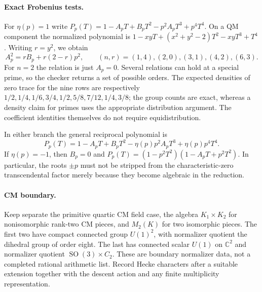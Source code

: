 \documentclass[11pt]{article}
\DeclareMathOperator{\SO}{SO}
\begin{document}
\paragraph{Exact Frobenius tests.}
For $\eta(p)=1$ write
$P_p(T)=1-A_pT+B_pT^2-p^2A_pT^3+p^4T^4$.
On a QM component the normalized polynomial is
$1-xyT+(x^2+y^2-2)T^2-xyT^3+T^4$.
Writing $r=y^2$, we obtain
\[
 A_p^2=rB_p+r(2-r)p^2,\qquad
 (n,r)=(1,4),(2,0),(3,1),(4,2),(6,3).
\]
For $n=2$ the relation is just $A_p=0$. Several relations can hold at a special
prime, so the checker returns a set of possible orders. The expected densities
of zero trace for the nine rows are respectively
$1/2,1/4,1/6,3/4,1/2,5/8,7/12,1/4,3/8$; the group counts are exact,
whereas a density claim for primes uses the appropriate distribution argument.
The coefficient identities themselves do not require equidistribution.

In either branch the general reciprocal polynomial is
\[
 P_p(T)=1-A_pT+B_pT^2-\eta(p)p^2A_pT^3+\eta(p)p^4T^4.
\]
If $\eta(p)=-1$, then $B_p=0$ and
$P_p(T)=(1-p^2T^2)(1-A_pT+p^2T^2)$.
In particular, the roots $\pm p$ must not be stripped from the characteristic-zero
transcendental factor merely because they become algebraic in the reduction.

\paragraph{CM boundary.}
Keep separate the primitive quartic CM field case, the algebra $K_1\times K_2$
for nonisomorphic rank-two CM pieces, and $M_2(K)$ for two isomorphic pieces.
The first two have compact connected group $U(1)^2$, with normalizer quotient
the dihedral group of order eight. The last has connected scalar $U(1)$ on
$\mathbb C^2$ and normalizer quotient $\SO(3)\times C_2$.
These are boundary normalizer data, not a completed rational arithmetic list.
Record Hecke characters after a suitable extension together with the descent
action and any finite multiplicity representation.
\end{document}
